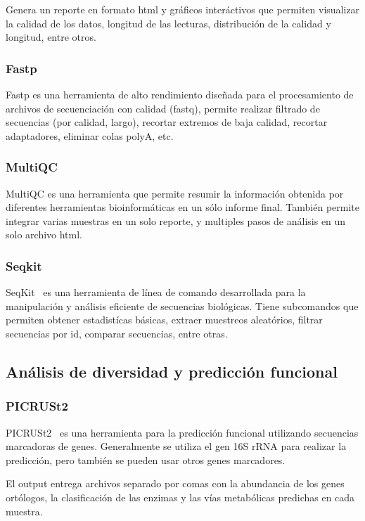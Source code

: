 Genera un reporte en formato html y gráficos interáctivos que permiten visualizar la calidad de los datos, longitud de las lecturas, distribución de la calidad y longitud, entre otros.
\subsubsection{Fastp}

Fastp\cite{chen2018fastp} es una herramienta de alto rendimiento diseñada para el procesamiento de archivos de secuenciación con calidad (fastq), permite realizar filtrado de secuencias (por calidad, largo), recortar extremos de baja calidad, recortar adaptadores, eliminar colas polyA, etc.
\subsubsection{MultiQC}
MultiQC \cite{ewels2016multiqc} es una herramienta que permite resumir la información obtenida por diferentes herramientas bioinformáticas en un sólo informe final. 
También permite integrar varias muestras en un solo reporte, y multiples pasos de análisis en un solo archivo html.


\subsubsection{Seqkit}
SeqKit~\cite{shen2016seqkit} es una herramienta de línea de comando desarrollada para la manipulación y análisis eficiente de secuencias biológicas. 
Tiene subcomandos que permiten obtener estadistícas básicas, extraer muestreos aleatórios, filtrar secuencias por id, comparar secuencias, entre otras.

\subsection{Análisis de diversidad y predicción funcional}
\subsubsection{PICRUSt2}
PICRUSt2~\cite{douglas2020picrust2} es una herramienta para la predicción funcional utilizando secuencias marcadoras de genes.
Generalmente se utiliza el gen 16S rRNA para realizar la predicción, pero también se pueden usar otros genes marcadores.

El output entrega archivos separado por comas con la abundancia de los genes ortólogos, la clasificación de las enzimas y las vías metabólicas predichas en cada muestra.

